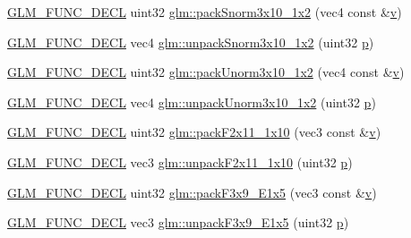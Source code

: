\begin{DoxyCompactItemize}
\item 
\mbox{\hyperlink{setup_8hpp_ab2d052de21a70539923e9bcbf6e83a51}{G\+L\+M\+\_\+\+F\+U\+N\+C\+\_\+\+D\+E\+CL}} uint32 \mbox{\hyperlink{group__gtc__packing_ga0d4157cec37c0312216a7be1cc92df54}{glm\+::pack\+Snorm3x10\+\_\+1x2}} (vec4 const \&\mbox{\hyperlink{_s_d_l__opengl_8h_a10a82eabcb59d2fcd74acee063775f90}{v}})
\item 
\mbox{\hyperlink{setup_8hpp_ab2d052de21a70539923e9bcbf6e83a51}{G\+L\+M\+\_\+\+F\+U\+N\+C\+\_\+\+D\+E\+CL}} vec4 \mbox{\hyperlink{group__gtc__packing_ga8b8bb827a3743ca553d8702d3e337101}{glm\+::unpack\+Snorm3x10\+\_\+1x2}} (uint32 \mbox{\hyperlink{_s_d_l__opengl__glext_8h_aa5367c14d90f462230c2611b81b41d23}{p}})
\item 
\mbox{\hyperlink{setup_8hpp_ab2d052de21a70539923e9bcbf6e83a51}{G\+L\+M\+\_\+\+F\+U\+N\+C\+\_\+\+D\+E\+CL}} uint32 \mbox{\hyperlink{group__gtc__packing_ga2cf2d11b40bd48639110456fd74c2e33}{glm\+::pack\+Unorm3x10\+\_\+1x2}} (vec4 const \&\mbox{\hyperlink{_s_d_l__opengl_8h_a10a82eabcb59d2fcd74acee063775f90}{v}})
\item 
\mbox{\hyperlink{setup_8hpp_ab2d052de21a70539923e9bcbf6e83a51}{G\+L\+M\+\_\+\+F\+U\+N\+C\+\_\+\+D\+E\+CL}} vec4 \mbox{\hyperlink{group__gtc__packing_gaf69ace2b5e9234f8afb4e99c3df1193d}{glm\+::unpack\+Unorm3x10\+\_\+1x2}} (uint32 \mbox{\hyperlink{_s_d_l__opengl__glext_8h_aa5367c14d90f462230c2611b81b41d23}{p}})
\item 
\mbox{\hyperlink{setup_8hpp_ab2d052de21a70539923e9bcbf6e83a51}{G\+L\+M\+\_\+\+F\+U\+N\+C\+\_\+\+D\+E\+CL}} uint32 \mbox{\hyperlink{group__gtc__packing_ga8c2a0eeee677ca4dafd9e093d9e81062}{glm\+::pack\+F2x11\+\_\+1x10}} (vec3 const \&\mbox{\hyperlink{_s_d_l__opengl_8h_a10a82eabcb59d2fcd74acee063775f90}{v}})
\item 
\mbox{\hyperlink{setup_8hpp_ab2d052de21a70539923e9bcbf6e83a51}{G\+L\+M\+\_\+\+F\+U\+N\+C\+\_\+\+D\+E\+CL}} vec3 \mbox{\hyperlink{group__gtc__packing_ga8b9c7991eb021d95c778bf5c0b2f7824}{glm\+::unpack\+F2x11\+\_\+1x10}} (uint32 \mbox{\hyperlink{_s_d_l__opengl__glext_8h_aa5367c14d90f462230c2611b81b41d23}{p}})
\item 
\mbox{\hyperlink{setup_8hpp_ab2d052de21a70539923e9bcbf6e83a51}{G\+L\+M\+\_\+\+F\+U\+N\+C\+\_\+\+D\+E\+CL}} uint32 \mbox{\hyperlink{group__gtc__packing_ga0984f9598edc648d59a9643d9a61b121}{glm\+::pack\+F3x9\+\_\+\+E1x5}} (vec3 const \&\mbox{\hyperlink{_s_d_l__opengl_8h_a10a82eabcb59d2fcd74acee063775f90}{v}})
\item 
\mbox{\hyperlink{setup_8hpp_ab2d052de21a70539923e9bcbf6e83a51}{G\+L\+M\+\_\+\+F\+U\+N\+C\+\_\+\+D\+E\+CL}} vec3 \mbox{\hyperlink{group__gtc__packing_ga15d8845a31e1e55d493803d0c8cb5910}{glm\+::unpack\+F3x9\+\_\+\+E1x5}} (uint32 \mbox{\hyperlink{_s_d_l__opengl__glext_8h_aa5367c14d90f462230c2611b81b41d23}{p}})

\end{DoxyCompactItemize}
